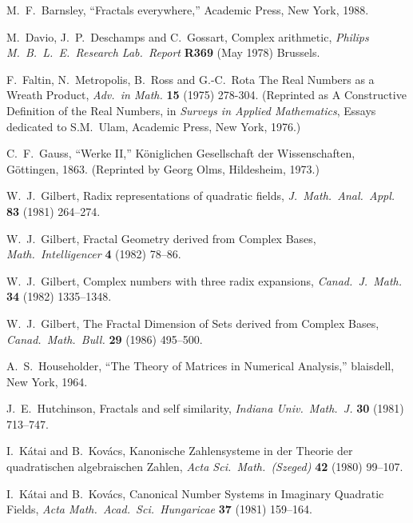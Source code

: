 \documentclass[12pt]{article}
\begin{document}
\newpage 
\begin{thebibliography}{10}

 {\sc M.~F.~Barnsley}, 
``Fractals everywhere,''
Academic Press, New York, 1988.

 {\sc M.~Davio, J.~P.~Deschamps and C.~Gossart,} 
Complex arithmetic,
{\em Philips M.\ B.\ L.\ E.\ Research Lab.\ Report} {\bf R369} (May 1978) Brussels.

 {\sc F.~Faltin, N.~Metropolis, B.~Ross and G.-C.~Rota} 
The Real Numbers as a Wreath Product,
{\em Adv.\ in Math.} {\bf 15} (1975) 278-304. 
(Reprinted as
A Constructive Definition of the Real Numbers, in {\em Surveys in Applied Mathematics}, Essays dedicated to S.M.~Ulam, Academic Press, New York, 1976.)

 {\sc C.~F.~Gauss,} 
``Werke II,'' K\"oniglichen Gesellschaft der Wissenschaften, 
G\"ottingen, 1863. (Reprinted by Georg Olms, Hildesheim, 1973.)

 {\sc W.~J.~Gilbert,} 
Radix representations of quadratic fields,
{\em J.\ Math.\ Anal.\ Appl.} {\bf 83} (1981) 264--274.

 {\sc W.~J.~Gilbert,} 
Fractal Geometry derived from Complex Bases,  
{\em Math.\ Intelligencer} {\bf 4} (1982) 78--86.

 {\sc W.~J.~Gilbert,} 
Complex numbers with three radix expansions,  
{\em Canad.\ J.\ Math.} {\bf 34} (1982) 1335--1348.


 {\sc W.~J.~Gilbert,} 
The Fractal Dimension of Sets derived from Complex Bases,
{\em Canad.\ Math.\ Bull.} {\bf 29} (1986) 495--500.

 {\sc A.~S.~Householder}, 
``The Theory of Matrices in Numerical Analysis,''
blaisdell, New York, 1964.

 {\sc J.~E.~Hutchinson,} 
Fractals and self similarity,
{\em Indiana Univ.\ Math.\ J.} {\bf 30} (1981) 713--747.

 {\sc I.~K\'atai and B.~Kov\'acs,} 
Kanonische Zahlensysteme in der Theorie der quadratischen algebraischen Zahlen, 
{\em Acta Sci.\ Math.\ (Szeged)} {\bf 42} (1980) 99--107.

 {\sc I.~K\'atai and B.~Kov\'acs,} 
Canonical Number Systems in Imaginary Quadratic Fields, 
{\em Acta Math.\ Acad.\ Sci.\ Hungaricae} {\bf 37} (1981) 159--164.


\end{thebibliography}
\end{document}
